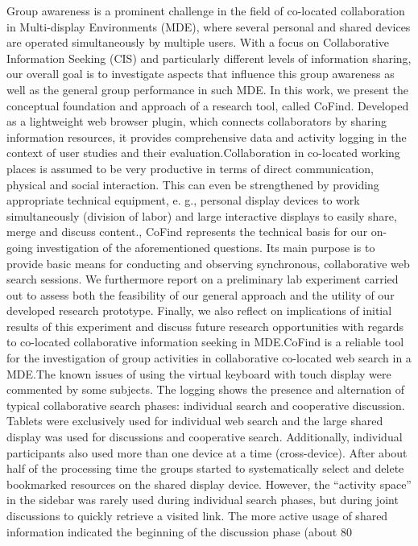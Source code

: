 Group awareness is a prominent challenge in the field of co-located collaboration in Multi-display Environments (MDE), where several personal and shared devices are operated simultaneously by multiple users. With a focus on Collaborative Information Seeking (CIS) and particularly different levels of information sharing, our overall goal is to investigate aspects that influence this group awareness as well as the general group performance in such MDE. In this work, we present the conceptual foundation and approach of a research tool, called CoFind. Developed as a lightweight web browser plugin, which connects collaborators by sharing information resources, it provides comprehensive data and activity logging in the context of user studies and their evaluation.Collaboration in co-located working places is assumed to be very productive in terms of direct communication, physical and social interaction. This can even be strengthened by providing appropriate technical equipment, e. g., personal display devices to work simultaneously (division of labor) and large interactive displays to easily share, merge and discuss content., CoFind represents the technical basis for our on-going investigation of the aforementioned questions. Its main purpose is to provide basic means for conducting and observing synchronous, collaborative web search sessions. We furthermore report on a preliminary lab experiment carried out to assess both the feasibility of our general approach and the utility of our developed research prototype. Finally, we also reflect on implications of initial results of this experiment and discuss future research opportunities with regards to co-located collaborative information seeking in MDE.CoFind is a reliable tool for the investigation of group activities in collaborative co-located web search in a MDE.The known issues of using the virtual keyboard with touch display were commented by some subjects. The logging shows the presence and alternation of typical collaborative search phases: individual search and cooperative discussion. Tablets were exclusively used for individual web search and the large shared display was used for discussions and cooperative search. Additionally, individual participants also used more than one device at a time (cross-device). After about half of the processing time the groups started to systematically select and delete bookmarked resources on the shared display device. However, the “activity space” in the sidebar was rarely used during individual search phases, but during joint discussions to quickly retrieve a visited link. The more active usage of shared information indicated the beginning of the discussion phase (about 80%


